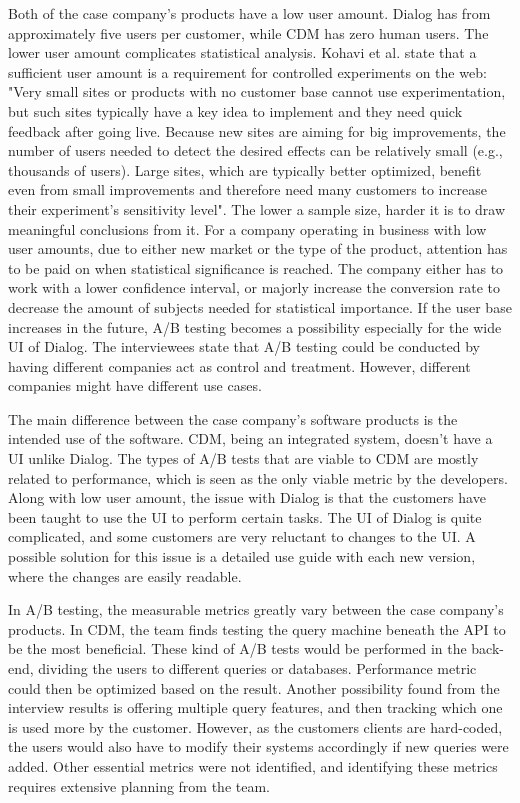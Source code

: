 \documentclass[english]{tktltiki2}
\theoremstyle{definition}
\theoremstyle{remark}
\begin{document}
Both of the case company's products have a low user amount. Dialog has from approximately five users per customer, while CDM has zero human users. The lower user amount complicates statistical analysis. Kohavi et al. \cite{kohavi2009online} state that a sufficient user amount is a requirement for controlled experiments on the web: "Very small sites or products with no customer base cannot use experimentation, but such sites typically have a key idea to implement and they need quick feedback after going live. Because new sites are aiming for big improvements, the number of users needed to detect the desired effects can be relatively small (e.g., thousands of users). Large sites, which are typically better optimized, benefit even from small improvements and therefore need many customers to increase their experiment’s sensitivity level". The lower a sample size, harder it is to draw meaningful conclusions from it. For a company operating in business with low user amounts, due to either new market or the type of the product, attention has to be paid on when statistical significance is reached. The company either has to work with a lower confidence interval, or majorly increase the conversion rate to decrease the amount of subjects needed for statistical importance. If the user base increases in the future, A/B testing becomes a possibility especially for the wide UI of Dialog. The interviewees state that A/B testing could be conducted by having different companies act as control and treatment. However, different companies might have different use cases.

The main difference between the case company's software products is the intended use of the software. CDM, being an integrated system, doesn't have a UI unlike Dialog. The types of A/B tests that are viable to CDM are mostly related to performance, which is seen as the only viable metric by the developers. Along with low user amount, the issue with Dialog is that the customers have been taught to use the UI to perform certain tasks. The UI of Dialog is quite complicated, and some customers are very reluctant to changes to the UI. A possible solution for this issue is a detailed use guide with each new version, where the changes are easily readable. 

In A/B testing, the measurable metrics greatly vary between the case company's products. In CDM, the team finds testing the query machine beneath the API to be the most beneficial. These kind of A/B tests would be performed in the back-end, dividing the users to different queries or databases. Performance metric could then be optimized based on the result. Another possibility found from the interview results is offering multiple query features, and then tracking which one is used more by the customer. However, as the customers clients are hard-coded, the users would also have to modify their systems accordingly if new queries were added. Other essential metrics were not identified, and identifying these metrics requires extensive planning from the team.
\end{document}
